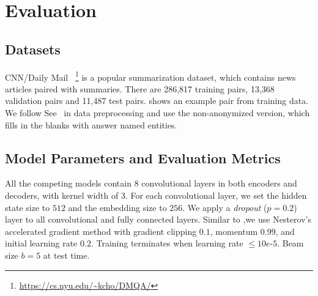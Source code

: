\section{Evaluation}
\label{sec:eval}

\subsection{Datasets}
CNN/Daily Mail~\cite{HermannKGEKSB15}
\footnote{\url{https://cs.nyu.edu/~kcho/DMQA/}} 
is a popular summarization dataset, 
which contains news articles paired with summaries.
There are 286,817 training pairs,
13,368 validation pairs and 11,487 test pairs.
 shows an example pair from training data.
We follow See~\cite{SeeLM17} in data preprocessing and use 
the non-anonymized version, which fills in the blanks with answer named entities.


\subsection{Model Parameters and Evaluation Metrics}
\label{sec:expset}
All the competing models contain $8$ convolutional layers in
both encoders and decoders, with kernel width of $3$.
For each convolutional layer, 
we set the hidden state size to $512$ and the embedding size to $256$.
We apply a \textit{dropout} ($p=0.2$) layer to 
all convolutional and fully connected layers.
Similar to \cite{gehring2017convs2s},we use Nesterov's
accelerated gradient method with gradient clipping $0.1$, momentum $0.99$,
and initial learning rate $0.2$.
Training terminates when learning rate $\le 10e$-$5$.
Beam size $b=5$ at test time.

